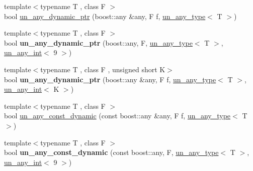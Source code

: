 \begin{DoxyCompactItemize}
\item 
{\footnotesize template$<$typename T , class F $>$ }\\bool \mbox{\hyperlink{group__boost__any__stuff_ga89921fc8079edf05986c4936cc6044e5}{un\+\_\+any\+\_\+dynamic\+\_\+ptr}} (boost\+::any \&any, F f, \mbox{\hyperlink{struct_s_m_spp__di__unipi__it_1_1un__any__type}{un\+\_\+any\+\_\+type}}$<$ T $>$)
\item 
\mbox{\label{group__boost__any__stuff_ga9d719fcc70990b21e1b9d4f6c4318243}} 
{\footnotesize template$<$typename T , class F $>$ }\\bool {\bfseries un\+\_\+any\+\_\+dynamic\+\_\+ptr} (boost\+::any, F, \mbox{\hyperlink{struct_s_m_spp__di__unipi__it_1_1un__any__type}{un\+\_\+any\+\_\+type}}$<$ T $>$, \mbox{\hyperlink{struct_s_m_spp__di__unipi__it_1_1un__any__int}{un\+\_\+any\+\_\+int}}$<$ 9 $>$)
\item 
\mbox{\label{group__boost__any__stuff_ga7fe443df1c62eedd9fe6dba220ace5ee}} 
{\footnotesize template$<$typename T , class F , unsigned short K$>$ }\\bool {\bfseries un\+\_\+any\+\_\+dynamic\+\_\+ptr} (boost\+::any \&any, F f, \mbox{\hyperlink{struct_s_m_spp__di__unipi__it_1_1un__any__type}{un\+\_\+any\+\_\+type}}$<$ T $>$, \mbox{\hyperlink{struct_s_m_spp__di__unipi__it_1_1un__any__int}{un\+\_\+any\+\_\+int}}$<$ K $>$)
\item 
{\footnotesize template$<$typename T , class F $>$ }\\bool \mbox{\hyperlink{group__boost__any__stuff_ga4bf31c5fd006a3483e0d5311259bd9e8}{un\+\_\+any\+\_\+const\+\_\+dynamic}} (const boost\+::any \&any, F f, \mbox{\hyperlink{struct_s_m_spp__di__unipi__it_1_1un__any__type}{un\+\_\+any\+\_\+type}}$<$ T $>$)
\item 
\mbox{\label{group__boost__any__stuff_gac76a7b82e06195d5f0a91b772d5e5186}} 
{\footnotesize template$<$typename T , class F $>$ }\\bool {\bfseries un\+\_\+any\+\_\+const\+\_\+dynamic} (const boost\+::any, F, \mbox{\hyperlink{struct_s_m_spp__di__unipi__it_1_1un__any__type}{un\+\_\+any\+\_\+type}}$<$ T $>$, \mbox{\hyperlink{struct_s_m_spp__di__unipi__it_1_1un__any__int}{un\+\_\+any\+\_\+int}}$<$ 9 $>$)
\item 
\mbox{\label{group__boost__any__stuff_ga7eeb79eed08057b87999ebf00d041ec1}} 

\end{DoxyCompactItemize}
